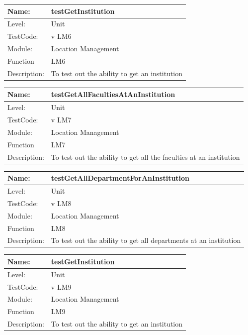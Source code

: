 \documentclass[12pt]{article}
\begin{document}
\begin{center}
\begin{tabular}{|l|p{12cm}|}
\hline

 Name: & testGetInstitution \\
 \hline
Level: & Unit \\
\hline
TestCode: & v LM6 \\
\hline
Module:& Location Management \\
\hline
Function & LM6 \\
\hline
Description: & To test out the ability to get an institution  \\
\hline
\end{tabular}
\end{center}

\begin{center}
\begin{tabular}{|l|p{12cm}|}
\hline

 Name: & testGetAllFacultiesAtAnInstitution \\
 \hline
Level: & Unit \\
\hline
TestCode: & v LM7 \\
\hline
Module:& Location Management \\
\hline
Function & LM7 \\
\hline
Description: & To test out the ability to get all the faculties at an institution  \\
\hline
\end{tabular}
\end{center}

\begin{center}
\begin{tabular}{|l|p{12cm}|}
\hline

 Name: & testGetAllDepartmentForAnInstitution \\
 \hline
Level: & Unit \\
\hline
TestCode: & v LM8 \\
\hline
Module:& Location Management \\
\hline
Function & LM8 \\
\hline
Description: & To test out the ability to get all departments at an institution  \\
\hline
\end{tabular}
\end{center}

\begin{center}
\begin{tabular}{|l|p{12cm}|}
\hline

 Name: & testGetInstitution \\
 \hline
Level: & Unit \\
\hline
TestCode: & v LM9 \\
\hline
Module:& Location Management \\
\hline
Function & LM9 \\
\hline
Description: & To test out the ability to get an institution  \\
\hline
\end{tabular}
\end{center}
\end{document}
